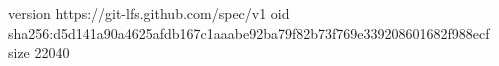 version https://git-lfs.github.com/spec/v1
oid sha256:d5d141a90a4625afdb167c1aaabe92ba79f82b73f769e339208601682f988ecf
size 22040
